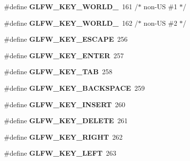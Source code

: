 \begin{DoxyCompactItemize}
\mbox{\label{group__keys_gadc78dad3dab76bcd4b5c20114052577a}} 
\#define {\bfseries G\+L\+F\+W\+\_\+\+K\+E\+Y\+\_\+\+W\+O\+R\+L\+D\+\_}~161 /$\ast$ non-\/US \#1 $\ast$/
\item 
\mbox{\label{group__keys_ga20494bfebf0bb4fc9503afca18ab2c5e}} 
\#define {\bfseries G\+L\+F\+W\+\_\+\+K\+E\+Y\+\_\+\+W\+O\+R\+L\+D\+\_}~162 /$\ast$ non-\/US \#2 $\ast$/
\item 
\mbox{\label{group__keys_gaac6596c350b635c245113b81c2123b93}} 
\#define {\bfseries G\+L\+F\+W\+\_\+\+K\+E\+Y\+\_\+\+E\+S\+C\+A\+PE}~256
\item 
\mbox{\label{group__keys_ga9555a92ecbecdbc1f3435219c571d667}} 
\#define {\bfseries G\+L\+F\+W\+\_\+\+K\+E\+Y\+\_\+\+E\+N\+T\+ER}~257
\item 
\mbox{\label{group__keys_ga6908a4bda9950a3e2b73f794bbe985df}} 
\#define {\bfseries G\+L\+F\+W\+\_\+\+K\+E\+Y\+\_\+\+T\+AB}~258
\item 
\mbox{\label{group__keys_ga6c0df1fe2f156bbd5a98c66d76ff3635}} 
\#define {\bfseries G\+L\+F\+W\+\_\+\+K\+E\+Y\+\_\+\+B\+A\+C\+K\+S\+P\+A\+CE}~259
\item 
\mbox{\label{group__keys_ga373ac7365435d6b0eb1068f470e34f47}} 
\#define {\bfseries G\+L\+F\+W\+\_\+\+K\+E\+Y\+\_\+\+I\+N\+S\+E\+RT}~260
\item 
\mbox{\label{group__keys_gadb111e4df74b8a715f2c05dad58d2682}} 
\#define {\bfseries G\+L\+F\+W\+\_\+\+K\+E\+Y\+\_\+\+D\+E\+L\+E\+TE}~261
\item 
\mbox{\label{group__keys_ga06ba07662e8c291a4a84535379ffc7ac}} 
\#define {\bfseries G\+L\+F\+W\+\_\+\+K\+E\+Y\+\_\+\+R\+I\+G\+HT}~262
\item 
\mbox{\label{group__keys_gae12a010d33c309a67ab9460c51eb2462}} 
\#define {\bfseries G\+L\+F\+W\+\_\+\+K\+E\+Y\+\_\+\+L\+E\+FT}~263
\item 
\mbox{\label{group__keys_gae2e3958c71595607416aa7bf082be2f9}} 

\end{DoxyCompactItemize}
